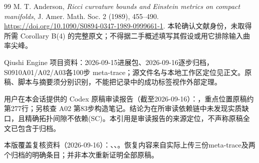 \documentclass[UTF8,a4paper,11pt,fontset=fandol]{ctexart}
\numberwithin{equation}{section}
\theoremstyle{definition}
\begin{document}
\begin{thebibliography}{99}
 M. T. Anderson, \emph{Ricci curvature bounds and Einstein metrics on compact manifolds}, J. Amer. Math. Soc. 2 (1989), 455--490. \url{https://doi.org/10.1090/S0894-0347-1989-0999661-1}. 本轮确认文献身份，未取得所需 Corollary B(4) 的完整原文；不得据二手概述填写其假设或用它排除输入曲率尖峰。

 Qiushi Engine 项目资料：2026-09-15进展包、2026-09-16逐步归档，S0910A01/A02/A03各100步 meta-trace；源文件名与本地工作区定位见正文。原稿、脚本与摘要须分别识别，不能把记录中的成功标签视作外部定理。

 用户在本会话提供的 Codex 原稿审读报告（截至2026-09-16）：，重点位置原稿约第277行；另核查 A02 第83步构造笔记。结论为在所审读依赖链中未发现实质缺口，且精确拓扑间隙不依赖(SC)。本引用是审读报告的来源定位，不声称原稿全文已包含于归档。

 本版覆盖复核资料（2026-09-16）：、、。恢复内容来自实际上传三份meta-trace及两个归档的明确条目；并非本次重新证明全部原稿。
\end{thebibliography}
\end{document}

